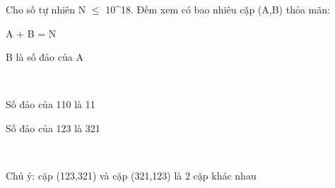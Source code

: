 Cho số tự nhiên N  $\le$  10^18. Đếm xem có bao nhiêu cặp (A,B) thỏa mãn:

A + B = N

B là số đảo của A

 

Số đảo của 110 là 11

Số đảo của 123 là 321

 

Chú ý: cặp (123,321) và cặp (321,123) là 2 cặp khác nhau

\